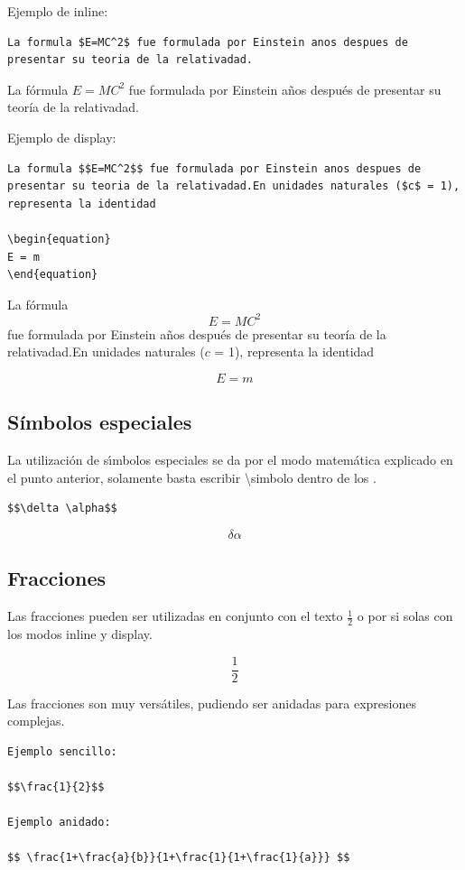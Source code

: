 \documentclass[letterpaper, 10pt, journal]{IEEEtran}
\begin{document}
Ejemplo de inline:

\begin{lstlisting}
La formula $E=MC^2$ fue formulada por Einstein anos despues de presentar su teoria de la relativadad.
\end{lstlisting}

La f\'{o}rmula $E=MC^2$ fue formulada por Einstein a\~{n}os despu\'{e}s de presentar su teor\'{i}a de la relativadad.

Ejemplo de display:
\begin{lstlisting}
La formula $$E=MC^2$$ fue formulada por Einstein anos despues de presentar su teoria de la relativadad.En unidades naturales ($c$ = 1), representa la identidad

\begin{equation}
E = m
\end{equation}
\end{lstlisting}
La f\'{o}rmula $$E=MC^2$$ fue formulada por Einstein a\~{n}os despu\'{e}s de presentar su teor\'{i}a de la relativadad.En unidades naturales ($c$ = 1), representa la identidad

\begin{equation}
E = m
\end{equation}

\subsection{S\'{i}mbolos especiales}
La utilizaci\'{o}n de s\'{\i}mbolos especiales se da por el modo matem\'{a}tica explicado en el punto anterior, solamente basta escribir \textbackslash{}simbolo dentro de los \textdollar{} \textdollar{}.

\begin{lstlisting}
$$\delta \alpha$$
\end{lstlisting}

$$\delta \alpha$$

\subsection{Fracciones}

Las fracciones pueden ser utilizadas en conjunto con el texto $\frac{1}{2} $ o por si solas con los modos inline y display.

$$\frac{1}{2} $$

Las fracciones son muy vers\'{a}tiles, pudiendo ser anidadas para expresiones complejas.

\begin{lstlisting}
Ejemplo sencillo:

$$\frac{1}{2}$$

Ejemplo anidado:
 
$$ \frac{1+\frac{a}{b}}{1+\frac{1}{1+\frac{1}{a}}} $$
 
\end{lstlisting}
\end{document}
